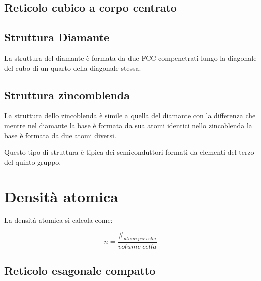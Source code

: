 \documentclass[10pt,a4paper]{report}
\begin{document}
	
		\subsection{Reticolo cubico a corpo centrato}
	
	
		\subsection{Struttura Diamante}
				La struttura del diamante è formata da due FCC compenetrati lungo la diagonale del cubo di un quarto della diagonale stessa.
	
		\subsection{Struttura zincomblenda}
				La struttura dello zincoblenda è simile a quella del diamante con la differenza che mentre nel diamante la base è formata da sua atomi identici nello zincoblenda la base è formata da due atomi diversi.

				Questo tipo di struttura è tipica dei semiconduttori formati da elementi del terzo del quinto gruppo.

		\section{Densità atomica}
		La densità atomica si calcola come:

		\[
		n=\frac{\#_{atomi \ per \ cella}}{volume \ cella}
		\]

		\subsection{Reticolo esagonale compatto}

\end{document}
